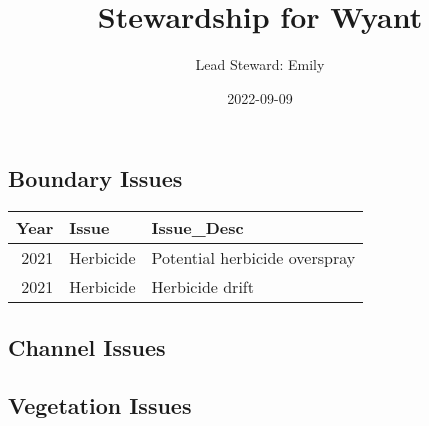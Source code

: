 \documentclass[
  landscape]{article}
\title{Stewardship for Wyant}
\author{Lead Steward: Emily}
\date{2022-09-09}
\begin{document}
\maketitle

\hypertarget{boundary-issues}{%
\subsection{Boundary Issues}\label{boundary-issues}}

\begin{longtable}[]{@{}rll@{}}
\toprule()
Year & Issue & Issue\_Desc \\
\midrule()
\endhead
2021 & Herbicide & Potential herbicide overspray \\
2021 & Herbicide & Herbicide drift \\
\bottomrule()
\end{longtable}

\hypertarget{channel-issues}{%
\subsection{Channel Issues}\label{channel-issues}}

\textbar\textbar{} \textbar\textbar{} \textbar\textbar{}
\textbar\textbar{}

\hypertarget{vegetation-issues}{%
\subsection{Vegetation Issues}\label{vegetation-issues}}
\end{document}
